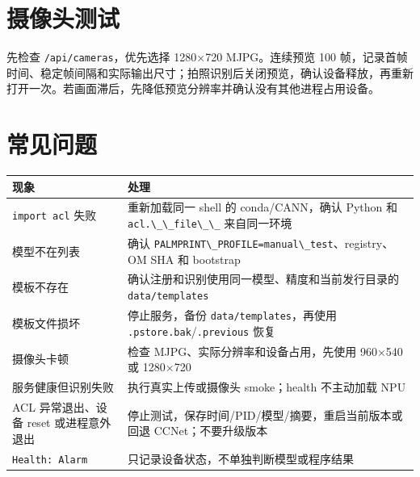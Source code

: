 \section{摄像头测试}\label{ux6444ux50cfux5934ux6d4bux8bd5}

先检查 \passthrough{\lstinline!/api/cameras!}，优先选择 1280×720
MJPG。连续预览 100
帧，记录首帧时间、稳定帧间隔和实际输出尺寸；拍照识别后关闭预览，确认设备释放，再重新打开一次。若画面滞后，先降低预览分辨率并确认没有其他进程占用设备。

\section{常见问题}\label{ux5e38ux89c1ux95eeux9898}

\begin{longtable}[]{@{}
  >{\raggedright\arraybackslash}p{}
  >{\raggedright\arraybackslash}p{}@{}}
\toprule\noalign{}
\begin{minipage}[b]{\linewidth}\raggedright
现象
\end{minipage} & \begin{minipage}[b]{\linewidth}\raggedright
处理
\end{minipage} \\
\midrule\noalign{}
\endhead
\bottomrule\noalign{}
\endlastfoot
\passthrough{\lstinline!import acl!} 失败 & 重新加载同一 shell 的
conda/CANN，确认 Python 和 \passthrough{\lstinline!acl.\_\_file\_\_!}
来自同一环境 \\
模型不在列表 & 确认
\passthrough{\lstinline!PALMPRINT\_PROFILE=manual\_test!}、registry、OM
SHA 和 bootstrap \\
模板不存在 & 确认注册和识别使用同一模型、精度和当前发行目录的
\passthrough{\lstinline!data/templates!} \\
模板文件损坏 & 停止服务，备份
\passthrough{\lstinline!data/templates!}，再使用
\passthrough{\lstinline!.pstore.bak!}/\passthrough{\lstinline!.previous!}
恢复 \\
摄像头卡顿 & 检查 MJPG、实际分辨率和设备占用，先使用 960×540 或
1280×720 \\
服务健康但识别失败 & 执行真实上传或摄像头 smoke；health 不主动加载
NPU \\
ACL 异常退出、设备 reset 或进程意外退出 &
停止测试，保存时间/PID/模型/摘要，重启当前版本或回退
CCNet；不要升级版本 \\
\passthrough{\lstinline!Health: Alarm!} &
只记录设备状态，不单独判断模型或程序结果 \\
\end{longtable}

